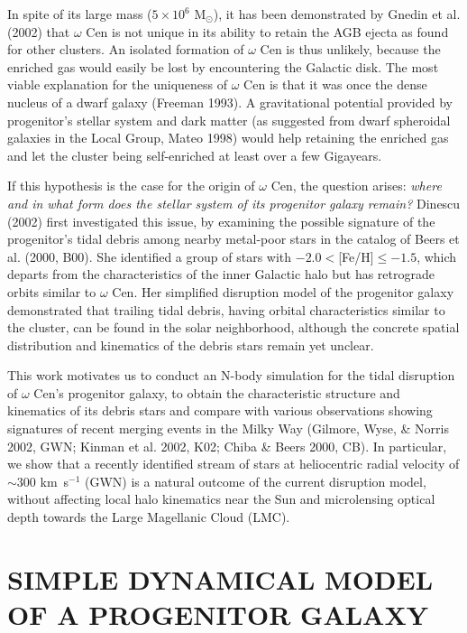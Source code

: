\documentclass[preprint,12pt]{aastex}
\begin{document}
In spite of its large mass ($5\times 10^6$ M$_\odot$), it has been
demonstrated by Gnedin et al. (2002) that $\omega$ Cen is not unique in
its ability to retain the AGB ejecta as found for other
clusters. An isolated formation of $\omega$ Cen is thus unlikely, because the
enriched gas would easily be lost by encountering the Galactic disk. The most
viable explanation for the uniqueness of $\omega$ Cen is that it was once
the dense nucleus of a dwarf galaxy (Freeman 1993). A gravitational
potential provided by progenitor's stellar system and dark matter
(as suggested from dwarf spheroidal galaxies in the Local Group, Mateo 1998)
would help retaining the enriched gas and let the cluster being self-enriched
at least over a few Gigayears.

If this hypothesis is the case for the origin of $\omega$ Cen, the question
arises: {\it where and in what form does the stellar system of its progenitor
galaxy remain?} Dinescu (2002) first investigated this issue,
by examining the possible signature of the progenitor's tidal debris among
nearby metal-poor stars in the catalog of Beers et al. (2000, B00).
She identified a group of stars with $-2.0<$[Fe/H]$\le-1.5$, which
departs from the characteristics of the inner Galactic halo but has
retrograde orbits similar to $\omega$ Cen. Her simplified disruption model of
the progenitor galaxy demonstrated that trailing tidal debris, having
orbital characteristics similar to the cluster, can be found in the solar
neighborhood, although the concrete spatial distribution and kinematics
of the debris stars remain yet unclear.

This work motivates us to conduct an N-body simulation for the tidal
disruption of $\omega$ Cen's progenitor galaxy, to obtain the
characteristic structure and kinematics of its debris stars and compare
with various observations showing signatures of recent merging events
in the Milky Way (Gilmore, Wyse, \& Norris 2002, GWN; Kinman et al. 2002,
K02; Chiba \& Beers 2000, CB).
In particular, we show that a recently identified stream of stars at
heliocentric radial velocity of $\sim 300$ km~s$^{-1}$ (GWN) is a natural
outcome of the current disruption model, without affecting
local halo kinematics near the Sun and microlensing optical depth towards
the Large Magellanic Cloud (LMC).


\section{SIMPLE DYNAMICAL MODEL OF A PROGENITOR GALAXY}
\end{document}
